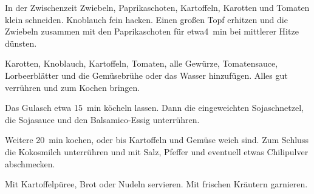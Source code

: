 \begin{recipeDP}
{        \step In der Zwischenzeit Zwiebeln, Paprikaschoten, Kartoffeln, Karotten und Tomaten klein schneiden. Knoblauch fein hacken.
        Einen großen Topf erhitzen und die Zwiebeln zusammen mit den Paprikaschoten für etwa\SI{4}{\minute} bei mittlerer Hitze dünsten.

        \step Karotten, Knoblauch, Kartoffeln, Tomaten, alle Gewürze, Tomatensauce, Lorbeerblätter und die Gemüsebrühe oder das Wasser hinzufügen. Alles gut verrühren und zum Kochen bringen.

        \step Das Gulasch etwa \SI{15}{\minute} köcheln lassen. Dann die eingeweichten Sojaschnetzel, die Sojasauce und den Balsamico-Essig unterrühren.

        \step Weitere \SI{20}{\minute} kochen, oder bis Kartoffeln und Gemüse weich sind. Zum Schluss die Kokosmilch unterrühren und mit Salz, Pfeffer und eventuell etwas Chilipulver abschmecken.

        \step Mit Kartoffelpüree, Brot oder Nudeln servieren. Mit frischen Kräutern garnieren.
    }

        

\end{recipeDP}
